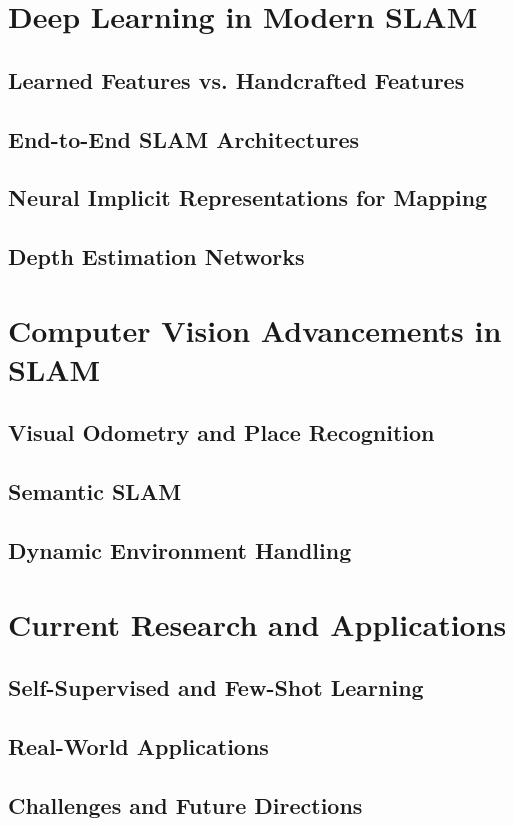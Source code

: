 \documentclass[12pt]{article}
\begin{document}
    \section{Deep Learning in Modern SLAM}
    \subsection{Learned Features vs. Handcrafted Features}
    \subsection{End-to-End SLAM Architectures}
    \subsection{Neural Implicit Representations for Mapping}
    \subsection{Depth Estimation Networks}

    \section{Computer Vision Advancements in SLAM}
    \subsection{Visual Odometry and Place Recognition}
    \subsection{Semantic SLAM}
    \subsection{Dynamic Environment Handling}

    \section{Current Research and Applications}
    \subsection{Self-Supervised and Few-Shot Learning}
    \subsection{Real-World Applications}
    \subsection{Challenges and Future Directions}
\end{document}
